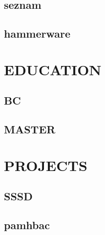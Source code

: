 \documentclass{mycv}
\begin{document}
\begin{paracol}{2}
\subsection{seznam}
\subsection{hammerware}

\section{EDUCATION}
\subsection{BC}
\subsection{MASTER}

\end{paracol}

\newpage

\section{PROJECTS}

\subsection{SSSD}

\subsection{pamhbac}

\faGithub
\faTwitter
\faMale
\end{document}
